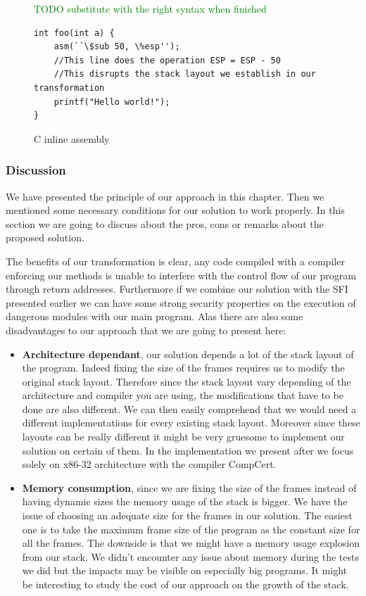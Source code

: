 \documentclass[11pt]{sdm}
\begin{document}
\begin{figure}
\textcolor{green}{TODO substitute with the right syntax when finished}
\begin{lstlisting}
int foo(int a) {
	asm(``\$sub 50, \%esp'');
	//This line does the operation ESP = ESP - 50
	//This disrupts the stack layout we establish in our transformation
	printf("Hello world!");
}
\end{lstlisting}
\centering
\caption{C inline assembly}
\label{inline_assembly}
\end{figure}

\subsubsection{Discussion}
\label{ssub:Discussion}
	We have presented the principle of our approach in this chapter. Then we mentioned some necessary conditions for our solution to work properly. In this section we are going to discuss about the pros, cons or remarks about the proposed solution.

	The benefits of our transformation is clear, any code compiled with a compiler enforcing our methods is unable to interfere with the control flow of our program through return addresses.
	Furthermore if we combine our solution with the SFI presented earlier we can have some strong security properties on the execution of dangerous modules with our main program.
Alas there are also some disadvantages to our approach that we are going to present here:
	\begin{itemize}
		\item \textbf{Architecture dependant}, our solution depends a lot of the stack layout of the program. Indeed fixing the size of the frames requires us to modify the original stack layout. Therefore since the stack layout vary depending of the architecture and compiler you are using, the modifications that have to be done are also different. We can then easily comprehend that we would need a different implementations for every existing stack layout. Moreover since these layouts can be really different it might be very gruesome to implement our solution on certain of them.
In the implementation we present after we focus solely on x86-32 architecture with the compiler CompCert.
		\item \textbf{Memory consumption}, since we are fixing the size of the frames instead of having dynamic sizes the memory usage of the stack is bigger. We have the issue of choosing an adequate size for the frames in our solution. The easiest one is to take the maximum frame size of the program as the constant size for all the frames. The downside is that we might have a memory usage explosion from our stack.
We didn't encounter any issue about memory during the tests we did but the impacts may be visible on especially big programs. It might be interesting to study the cost of our approach on the growth of the stack.
	\end{itemize}
\end{document}
